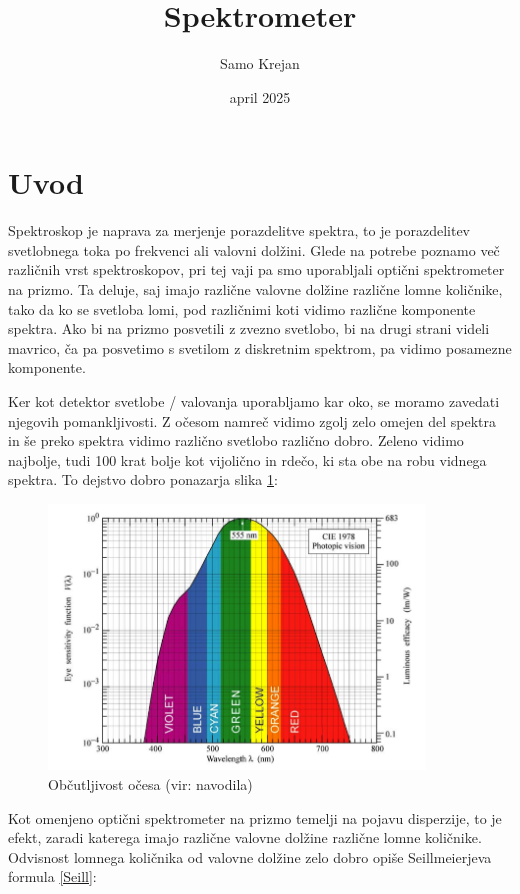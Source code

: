 \documentclass[12pt]{article}
\title{\textbf{Spektrometer}}
\author{Samo Krejan}
\date{april 2025}
\begin{document}
\maketitle

\section{Uvod}
Spektroskop je naprava za merjenje porazdelitve spektra, to je porazdelitev svetlobnega toka po frekvenci ali valovni dolžini. Glede na potrebe poznamo več različnih vrst spektroskopov, pri tej vaji pa smo uporabljali optični spektrometer na prizmo. Ta deluje, saj imajo različne valovne dolžine različne lomne količnike, tako da ko se svetloba lomi, pod različnimi koti vidimo različne komponente spektra. Ako bi na prizmo posvetili z zvezno svetlobo, bi na drugi strani videli mavrico, ča pa posvetimo s svetilom z diskretnim spektrom, pa vidimo posamezne komponente.

Ker kot detektor svetlobe / valovanja uporabljamo kar oko, se moramo zavedati njegovih pomankljivosti. Z očesom namreč vidimo zgolj zelo omejen del spektra in še preko spektra vidimo različno svetlobo različno dobro. Zeleno vidimo najbolje, tudi 100 krat bolje kot vijolično in rdečo, ki sta obe na robu vidnega spektra. To dejstvo dobro ponazarja slika \ref{oko}:

\begin{figure}[ht]
\begin{center}
    \includegraphics[width=10cm]{oko.png}
    \caption{Občutljivost očesa (vir: navodila)}
    \label{oko}
\end{center}
\end{figure}

Kot omenjeno optični spektrometer na prizmo temelji na pojavu disperzije, to je efekt, zaradi katerega imajo različne valovne dolžine različne lomne količnike. Odvisnost lomnega količnika od valovne dolžine zelo dobro opiše Seillmeierjeva formula \ref{Seill}:
\end{document}
